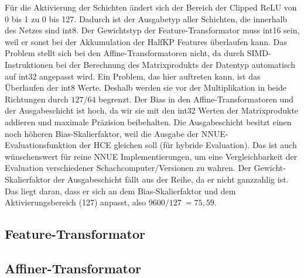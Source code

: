 \begin{table}[h]
  \caption{Skalierfaktor und Datentypen für Gewichte und Bias des \acp{NNUE} sowie Ausgabetyp der Schichten.}
  \label{table:netQuantization}
  \renewcommand{\arraystretch}{1.2}
  \centering
  \sffamily
  \begin{footnotesize}
  \end{footnotesize}
  \rmfamily
\end{table}

Für die Aktivierung der Schichten ändert sich der Bereich der Clipped \ac{ReLU} von 0 bis 1 zu 0 bis 127. Dadurch ist der Ausgabetyp aller Schichten, die innerhalb des Netzes sind int8. Der Gewichtstyp der Feature-Transformator muss int16 sein, weil er sonst bei der Akkumulation der HalfKP Features überlaufen kann. Das Problem stellt sich bei den Affine-Transformatoren nicht, da durch \ac{SIMD}-Instruktionen bei der Berechnung des Matrixprodukts der Datentyp automatisch auf int32 angepasst wird. Ein Problem, das hier auftreten kann, ist das Überlaufen der int8 Werte. Deshalb werden sie vor der Multiplikation in beide Richtungen durch $127/64$ begrenzt. Der Bias in den Affine-Transformatoren und der Ausgabeschicht ist hoch, da wir sie mit den int32 Werten der Matrixprodukte addieren und maximale Präzision beibehalten. Die Ausgabeschicht besitzt einen noch höheren Bias-Skalierfaktor, weil die Ausgabe der \ac{NNUE}-Evaluationsfunktion der \ac{HCE} gleichen soll (für hybride Evaluation). Das ist auch wünschenswert für reine NNUE Implementierungen, um eine Vergleichbarkeit der Evaluation verschiedener Schachcomputer/Versionen zu wahren. Der Gewicht-Skalierfaktor der Ausgabeschicht fällt aus der Reihe, da er nicht ganzzahlig ist. Das liegt daran, dass er sich an dem Bias-Skalierfaktor und dem Aktivierungsbereich (127) anpasst, also $9600/127~=75,59$.

\subsection{Feature-Transformator}


\subsection{Affiner-Transformator}
